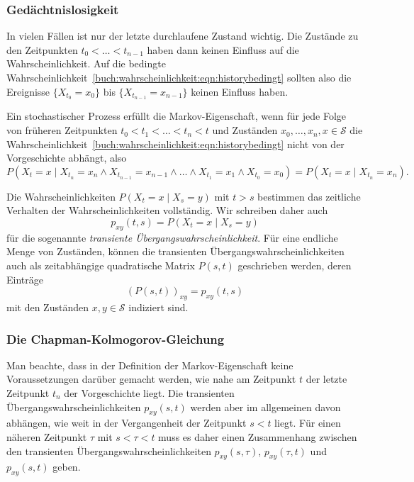 \subsubsection{Gedächtnislosigkeit}
%
In vielen Fällen ist nur der letzte durchlaufene Zustand wichtig.
Die Zustände zu den Zeitpunkten $t_0<\dots<t_{n-1}$ haben dann keinen
Einfluss auf die Wahrscheinlichkeit.
Auf die bedingte
Wahrscheinlichkeit~\eqref{buch:wahrscheinlichkeit:eqn:historybedingt}
sollten also die Ereignisse $\{X_{t_0}=x_0\}$ bis $\{X_{t_{n-1}}=x_{n-1}\}$
keinen Einfluss haben.

\begin{definition}
Ein stochastischer Prozess erfüllt die Markov-Eigenschaft, wenn 
für jede Folge von früheren Zeitpunkten $t_0<t_1<\dots <t_n<t$ und Zuständen
$x_0,\dots,x_n,x\in \mathcal{S}$ die 
Wahrscheinlichkeit~\eqref{buch:wahrscheinlichkeit:eqn:historybedingt}
nicht von der Vorgeschichte abhängt, also
\[
P(X_t = x\mid
X_{t_n}=x_n\wedge X_{t_{n-1}}=x_{n-1}\wedge\dots\wedge X_{t_1}=x_1\wedge
X_{t_0}=x_0)
=
P(X_t = x \mid
X_{t_n}=x_n).
\]
\end{definition}

Die Wahrscheinlichkeiten $P(X_t=x\mid X_s=y)$ mit $t>s$ bestimmen das
zeitliche Verhalten der Wahrscheinlichkeiten vollständig.
Wir schreiben daher auch
\[
p_{xy}(t, s)
=
P(X_t = x\mid X_s=y)
\]
für die sogenannte {\em transiente Übergangswahrscheinlichkeit}.
%
Für eine endliche Menge von Zuständen, können die transienten
Übergangswahrscheinlichkeiten auch als zeitabhängige 
quadratische Matrix $P(s,t)$ geschrieben werden, deren
Einträge
\[
(P(s,t))_{xy}
=
p_{xy}(t,s)
\]
mit den Zuständen $x,y\in\mathcal{S}$ indiziert sind.

\subsubsection{Die Chapman-Kolmogorov-Gleichung}
%
Man beachte, dass in der Definition der Markov-Eigenschaft
keine Voraussetzungen darüber gemacht werden, wie nahe
am Zeitpunkt $t$ der letzte Zeitpunkt $t_n$ der Vorgeschichte liegt.
Die transienten Übergangswahrscheinlichkeiten $p_{xy}(s,t)$ werden
aber im allgemeinen davon abhängen, wie weit in der Vergangenheit
der Zeitpunkt $s<t$ liegt.
Für einen näheren Zeitpunkt $\tau$ mit $s<\tau <t$ muss es daher
einen Zusammenhang zwischen den transienten Übergangswahrscheinlichkeiten
$p_{xy}(s,\tau)$, $p_{xy}(\tau,t)$ und $p_{xy}(s,t)$ geben.

